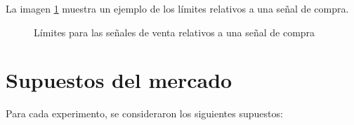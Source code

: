 \documentclass[12pt]{report}
\theoremstyle{break}
\theoremstyle{break}
\begin{document}
La imagen \ref{imagen:bandas horizontales} muestra un ejemplo de los límites relativos a una señal de compra.

\begin{figure}[htbp]
\centering
{}
\caption{\label{imagen:bandas horizontales} Límites para las señales de venta relativos a una señal de compra}
\end{figure}

\section{Supuestos del mercado}
\label{sec:supuestos del mercado}
Para cada experimento, se consideraron los siguientes supuestos:
\end{document}
